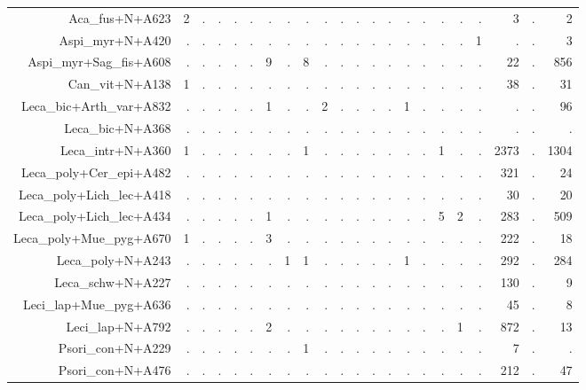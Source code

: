 \documentclass[a4paper, 11]{article}\usepackage[]{graphicx}\usepackage[]{color}
\begin{document}
\begin{table}
\begin{tabular}{rrrrrrrrrrrrrrrrrrrrrr}
  \hline
Aca\_fus+N+A623 & 2 & . & . & . & . & . & . & . & . & . & . & . & . & . & . & . & . & . & 3 & . & 2 \\ 
  Aspi\_myr+N+A420 & . & . & . & . & . & . & . & . & . & . & . & . & . & . & . & . & . & 1 & . & . & 3 \\ 
  Aspi\_myr+Sag\_fis+A608 & . & . & . & . & . & 9 & . & 8 & . & . & . & . & . & . & . & . & . & . & 22 & . & 856 \\ 
  Can\_vit+N+A138 & 1 & . & . & . & . & . & . & . & . & . & . & . & . & . & . & . & . & . & 38 & . & 31 \\ 
  Leca\_bic+Arth\_var+A832 & . & . & . & . & . & 1 & . & . & 2 & . & . & . & . & 1 & . & . & . & . & . & . & 96 \\ 
  Leca\_bic+N+A368 & . & . & . & . & . & . & . & . & . & . & . & . & . & . & . & . & . & . & . & . & . \\ 
  Leca\_intr+N+A360 & 1 & . & . & . & . & . & . & 1 & . & . & . & . & . & . & . & 1 & . & . & 2373 & . & 1304 \\ 
  Leca\_poly+Cer\_epi+A482 & . & . & . & . & . & . & . & . & . & . & . & . & . & . & . & . & . & . & 321 & . & 24 \\ 
  Leca\_poly+Lich\_lec+A418 & . & . & . & . & . & . & . & . & . & . & . & . & . & . & . & . & . & . & 30 & . & 20 \\ 
  Leca\_poly+Lich\_lec+A434 & . & . & . & . & . & 1 & . & . & . & . & . & . & . & . & . & 5 & 2 & . & 283 & . & 509 \\ 
  Leca\_poly+Mue\_pyg+A670 & 1 & . & . & . & . & 3 & . & . & . & . & . & . & . & . & . & . & . & . & 222 & . & 18 \\ 
  Leca\_poly+N+A243 & . & . & . & . & . & . & 1 & 1 & . & . & . & . & . & 1 & . & . & . & . & 292 & . & 284 \\ 
  Leca\_schw+N+A227 & . & . & . & . & . & . & . & . & . & . & . & . & . & . & . & . & . & . & 130 & . & 9 \\ 
  Leci\_lap+Mue\_pyg+A636 & . & . & . & . & . & . & . & . & . & . & . & . & . & . & . & . & . & . & 45 & . & 8 \\ 
  Leci\_lap+N+A792 & . & . & . & . & . & 2 & . & . & . & . & . & . & . & . & . & . & 1 & . & 872 & . & 13 \\ 
  Psori\_con+N+A229 & . & . & . & . & . & . & . & 1 & . & . & . & . & . & . & . & . & . & . & 7 & . & . \\ 
  Psori\_con+N+A476 & . & . & . & . & . & . & . & . & . & . & . & . & . & . & . & . & . & . & 212 & . & 47 \\ 

\end{tabular}
\end{table}
\end{document}
